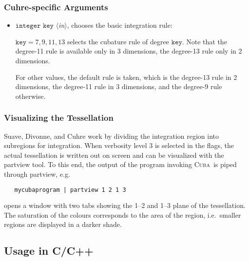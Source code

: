 \documentclass[12pt]{article}
\newcommand\cuba{\textsc{Cuba}}
\newcommand\ie{i.e.\ }
\newcommand\eg{e.g.\ }
\newcommand\Code[1]{\ensuremath{\texttt{#1}}}
\newcommand\VarIn[1]{\item\Code{#1} \textit{$\langle$in\/$\rangle$},}
\begin{document}
\subsubsection{Cuhre-specific Arguments}

\begin{itemize}
\VarIn{integer key}
chooses the basic integration rule:

$\Code{key} = 7, 9, 11, 13$ selects the cubature rule of degree 
\Code{key}.  Note that the degree-11 rule is available only in 3
dimensions, the degree-13 rule only in 2 dimensions.

For other values, the default rule is taken, which is the degree-13 rule 
in 2 dimensions, the degree-11 rule in 3 dimensions, and the degree-9 
rule otherwise.
\end{itemize}


\subsubsection{Visualizing the Tessellation}

Suave, Divonne, and Cuhre work by dividing the integration region into 
subregions for integration.  When verbosity level 3 is selected in the 
flags, the actual tessellation is written out on screen and can be 
visualized with the partview tool.  To this end, the output of the 
program invoking \cuba\ is piped through partview, \eg
\begin{verbatim}
   mycubaprogram | partview 1 2 1 3
\end{verbatim}
opens a window with two tabs showing the 1--2 and 1--3 plane of the 
tessellation.  The saturation of the colours corresponds to the area of
the region, \ie smaller regions are displayed in a darker shade.


\subsection{Usage in C/C++}
\end{document}
